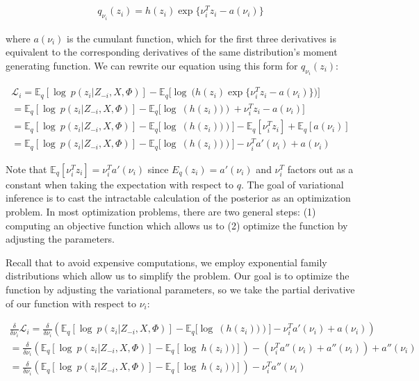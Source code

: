 \begin{align} q_{\nu_i}(z_i) = h(z_i) \exp \big\{ \nu_i^{T} z_i - a(\nu_i) \big\} \end{align}

where $a(\nu_i)$ is the cumulant function, which for the first three derivatives is equivalent to the corresponding derivatives of the same distribution's moment generating function. We can rewrite our equation using this form for $q_{\nu_i}(z_i)$:


\begin{align} 
\nonumber \mathcal{L}_i = \mathbb{E}_q[\log\ p(z_i| Z_{-i}, X, \Phi)] - \mathbb{E}_q\bigg[\log\ \Big( h(z_i) \exp \big\{ \nu_i^{T} z_i - a(\nu_i) \big\} \Big) \bigg] \\
\nonumber = \mathbb{E}_q[\log\ p(z_i| Z_{-i}, X, \Phi)] -  \mathbb{E}_q\bigg[\log\ \left( h(z_i))\right) + \nu_i^{T} z_i - a(\nu_i) \bigg] \\
\nonumber = \mathbb{E}_q[\log\ p(z_i| Z_{-i}, X, \Phi)] -  \mathbb{E}_q\big[\log\ \left( h(z_i))\right)\big] - \mathbb{E}_q[\nu_i^T z_i]  + \mathbb{E}_q[a(\nu_i)] \\
= \mathbb{E}_q[\log\ p(z_i| Z_{-i}, X, \Phi)] -  \mathbb{E}_q\big[\log\ \left( h(z_i))\right)\big] - \nu_i^T a'(\nu_i) + a(\nu_i)
\end{align} 


Note that $\mathbb{E}_q[\nu_i^Tz_i] = \nu_i^T a'(\nu_i)$ since $E_q(z_i) = a'(\nu_i)$ and $\nu_i^T$ factors out as a constant when taking the expectation with respect to $q$. The goal of variational inference is to cast the intractable calculation of the posterior as an optimization problem. In most optimization problems, there are two general steps: (1) computing an objective function which allows us to (2) optimize the function by adjusting the parameters. 


Recall that to avoid expensive computations, we employ exponential family distributions which allow us to simplify the problem. Our goal is to optimize the function by adjusting the variational parameters, so we take the partial derivative of our function with respect to $\nu_i$: 

\begin{align}
\nonumber \frac{\delta}{\delta \nu_i} \mathcal{L}_i = \frac{\delta}{\delta \nu_i} \left( \mathbb{E}_q[\log\ p(z_i| Z_{-i}, X, \Phi)] -  \mathbb{E}_q\big[\log\ \left( h(z_i))\right)\big] - \nu_i^T a'(\nu_i) + a(\nu_i) \right) \\
\nonumber = \frac{\delta}{\delta \nu_i} \left( \mathbb{E}_q[\log\ p(z_i| Z_{-i}, X, \Phi)] -  \mathbb{E}_q[\log\ h(z_i))] \right) - \left(\nu_i^Ta''(\nu_i)  + a''(\nu_i)\right) + a''(\nu_i) \\
= \frac{\delta}{\delta \nu_i} \left( \mathbb{E}_q[\log\ p(z_i| Z_{-i}, X, \Phi)] -  \mathbb{E}_q[\log\ h(z_i))] \right) - \nu_i^Ta''(\nu_i)
\end{align}

